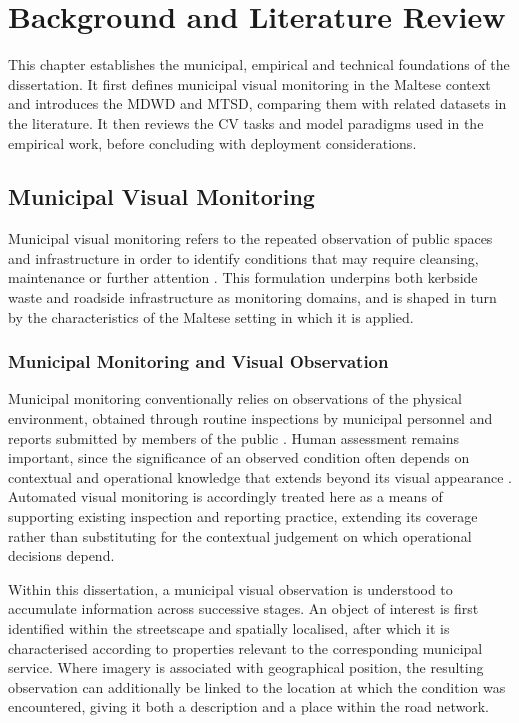 \chapter{Background and Literature Review}
\label{ch:bg-lit}
This chapter establishes the municipal, empirical and technical foundations of the dissertation. It first defines municipal visual monitoring in the Maltese context and introduces the \gls{MDWD} and \gls{MTSD}, comparing them with related datasets in the literature. It then reviews the \gls{CV} tasks and model paradigms used in the empirical work, before concluding with deployment considerations.

\section{Municipal Visual Monitoring}
\label{sec:bg-municipal}
Municipal visual monitoring refers to the repeated observation of public spaces and infrastructure in order to identify conditions that may require cleansing, maintenance or further attention \cite{torneiro2025urbanmonitoring}. This formulation underpins both kerbside waste and roadside infrastructure as monitoring domains, and is shaped in turn by the characteristics of the Maltese setting in which it is applied.

\subsection{Municipal Monitoring and Visual Observation}
\label{sec:bg-municipal-inspection}
Municipal monitoring conventionally relies on observations of the physical environment, obtained through routine inspections by municipal personnel and reports submitted by members of the public \cite{BG1-repeatedinspection,BG2-waste-reporting,BG3-citizen-reporting}. Human assessment remains important, since the significance of an observed condition often depends on contextual and operational knowledge that extends beyond its visual appearance \cite{BG4-human-inspection}. Automated visual monitoring is accordingly treated here as a means of supporting existing inspection and reporting practice, extending its coverage rather than substituting for the contextual judgement on which operational decisions depend.

Within this dissertation, a municipal visual observation is understood to accumulate information across successive stages. An object of interest is first identified within the streetscape and spatially localised, after which it is characterised according to properties relevant to the corresponding municipal service. Where imagery is associated with geographical position, the resulting observation can additionally be linked to the location at which the condition was encountered, giving it both a description and a place within the road network.

